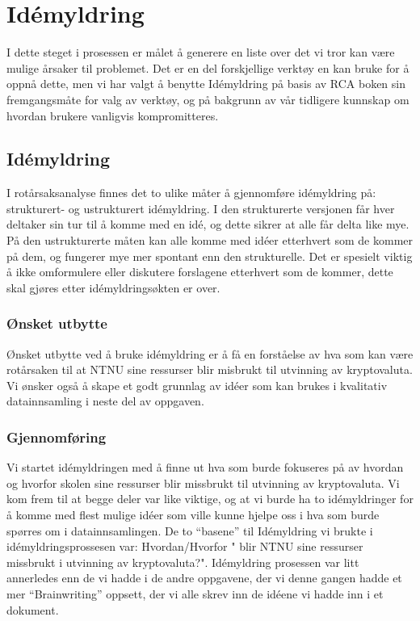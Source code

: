 \chapter{Idémyldring}
I dette steget i prosessen er målet å generere en liste over det vi tror kan være mulige årsaker til problemet. Det er en del forskjellige verktøy en kan bruke for å oppnå dette, men vi har valgt å benytte Idémyldring på basis av RCA boken \cite{RCA} sin fremgangsmåte for valg av verktøy, og på bakgrunn av vår tidligere kunnskap om hvordan brukere vanligvis kompromitteres. 

\section{Idémyldring}
I rotårsaksanalyse finnes det to ulike måter å gjennomføre idémyldring på: strukturert- og ustrukturert idémyldring. I den strukturerte versjonen får hver deltaker sin tur til å komme med en idé, og dette sikrer at alle får delta like mye. På den ustrukturerte måten kan alle komme med idéer etterhvert som de kommer på dem, og fungerer mye mer spontant enn den strukturelle. Det er spesielt viktig å ikke omformulere eller diskutere forslagene etterhvert som de kommer, dette skal gjøres etter idémyldringsøkten er over.

\subsection{Ønsket utbytte}
Ønsket utbytte ved å bruke idémyldring er å få en forståelse av hva som kan være rotårsaken til at NTNU sine ressurser blir misbrukt til utvinning av kryptovaluta. Vi ønsker også å skape et godt grunnlag av idéer som kan brukes i kvalitativ datainnsamling i neste del av oppgaven.

\subsection{Gjennomføring}
Vi startet idémyldringen med å finne ut hva som burde fokuseres på av hvordan og hvorfor skolen sine ressurser blir missbrukt til utvinning av kryptovaluta. Vi kom frem til at begge deler var like viktige, og at vi burde ha to idémyldringer for å komme med flest mulige idéer som ville kunne hjelpe oss i hva som burde spørres om i datainnsamlingen. De to ``basene'' til Idémyldring vi brukte i idémyldringsprossesen var:  Hvordan/Hvorfor " blir NTNU sine ressurser missbrukt i utvinning av kryptovaluta?". Idémyldring prosessen var litt annerledes enn de vi hadde i de andre oppgavene, der vi denne gangen hadde et mer ``Brainwriting'' oppsett, der vi alle skrev inn de idéene vi hadde inn i et dokument.

